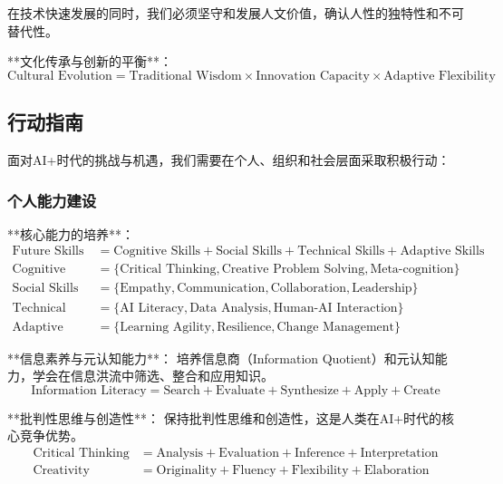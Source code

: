 在技术快速发展的同时，我们必须坚守和发展人文价值，确认人性的独特性和不可替代性。

**文化传承与创新的平衡**：
\begin{equation}
\text{Cultural Evolution} = \text{Traditional Wisdom} \times \text{Innovation Capacity} \times \text{Adaptive Flexibility}
\end{equation}

\subsection{行动指南} %

面对AI+时代的挑战与机遇，我们需要在个人、组织和社会层面采取积极行动：

\subsubsection{个人能力建设} %

**核心能力的培养**：
\begin{align}
\text{Future Skills} &= \text{Cognitive Skills} + \text{Social Skills} + \text{Technical Skills} + \text{Adaptive Skills} \\
\text{Cognitive Skills} &= \{\text{Critical Thinking}, \text{Creative Problem Solving}, \text{Meta-cognition}\} \\
\text{Social Skills} &= \{\text{Empathy}, \text{Communication}, \text{Collaboration}, \text{Leadership}\} \\
\text{Technical Skills} &= \{\text{AI Literacy}, \text{Data Analysis}, \text{Human-AI Interaction}\} \\
\text{Adaptive Skills} &= \{\text{Learning Agility}, \text{Resilience}, \text{Change Management}\}
\end{align}

**信息素养与元认知能力**：
培养信息商（Information Quotient）和元认知能力，学会在信息洪流中筛选、整合和应用知识。
\begin{equation}
\text{Information Literacy} = \text{Search} + \text{Evaluate} + \text{Synthesize} + \text{Apply} + \text{Create}
\end{equation}

**批判性思维与创造性**：
保持批判性思维和创造性，这是人类在AI+时代的核心竞争优势。
\begin{align}
\text{Critical Thinking} &= \text{Analysis} + \text{Evaluation} + \text{Inference} + \text{Interpretation} \\
\text{Creativity} &= \text{Originality} + \text{Fluency} + \text{Flexibility} + \text{Elaboration}
\end{align}


